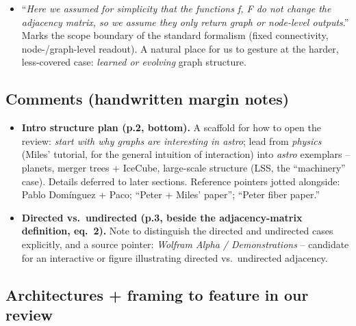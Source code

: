 \begin{itemize}
    \item ``\emph{Here we assumed for simplicity that the functions f, F do not
        change the adjacency matrix, so we assume they only return graph or
        node-level outputs}.'' Marks the scope boundary of the standard
        formalism (fixed connectivity, node-/graph-level readout). A natural
        place for us to gesture at the harder, less-covered case: \emph{learned
        or evolving} graph structure.
\end{itemize}

\subsection*{Comments (handwritten margin notes)}

\begin{itemize}
    \item \textbf{Intro structure plan (p.2, bottom).} A scaffold for how to
        open the review: \emph{start with why graphs are interesting in
        astro}; lead from \emph{physics} (Miles' tutorial, for the general
        intuition of interaction) into \emph{astro} exemplars -- planets,
        merger trees + IceCube, large-scale structure (LSS, the ``machinery''
        case). Details deferred to later sections. Reference pointers jotted
        alongside: Pablo Dom\'inguez + Paco; ``Peter + Miles' paper''; ``Peter
        fiber paper.''
    \item \textbf{Directed vs.\ undirected (p.3, beside the adjacency-matrix
        definition, eq.~2).} Note to distinguish the directed and undirected
        cases explicitly, and a source pointer: \emph{Wolfram Alpha /
        Demonstrations} -- candidate for an interactive or figure illustrating
        directed vs.\ undirected adjacency.
\end{itemize}

\subsection*{Architectures + framing to feature in our review}

